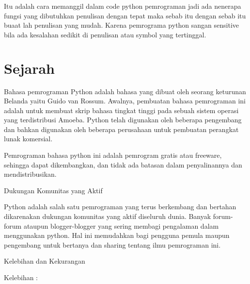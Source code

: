 {{{{{{{{\vspace{14pt}
\noindent 
{\fontsize{14pt}{14pt}\selectfont Itu adalah cara memanggil dalam code python pemrograman jadi ada nenerapa fungsi yang dibutuhkan penulisan dengan tepat maka sebab itu dengan sebab itu buaat lah penulisan yang mudah. Karena pemrograma python sangan sensitive bila ada kesalahan sedikit di penulisan atau symbol yang tertinggal. \\} \par
\vspace{14pt}
\vspace{14pt}
\noindent 
{\fontsize{14pt}{14pt}\section {Sejarah}
\noindent 
{\fontsize{14pt}{14pt}\selectfont Bahasa pemrograman Python adalah bahasa yang dibuat oleh seorang keturunan Belanda yaitu Guido van Rossum. Awalnya, pembuatan bahasa pemrograman ini adalah untuk membuat skrip bahasa tingkat tinggi pada sebuah sistem operasi yang terdistribusi Amoeba. Python telah digunakan oleh beberapa pengembang dan bahkan digunakan oleh beberapa perusahaan untuk pembuatan perangkat lunak komersial. \\} \par
\noindent 
{\fontsize{14pt}{14pt}\selectfont Pemrograman bahasa python ini adalah pemrogram gratis atau freeware, sehingga dapat dikembangkan, dan tidak ada batasan dalam penyalinannya dan mendistribusikan. \\} \par
\vspace{14pt}
\noindent 
{\fontsize{14pt}{14pt}\selectfont Dukungan Komunitas yang Aktif \\} \par
\noindent 
{\fontsize{14pt}{14pt}\selectfont Python adalah salah satu pemrograman yang terus berkembang dan bertahan dikarenakan dukungan komunitas yang aktif diseluruh dunia. Banyak forum-forum ataupun blogger-blogger yang sering membagi pengalaman dalam menggunakan python. Hal ini memudahkan bagi pengguna pemula maupun pengembang untuk bertanya dan sharing tentang ilmu pemrograman ini. \\} \par
\noindent 
{\fontsize{14pt}{14pt}\selectfont Kelebihan dan Kekurangan \\} \par
\vspace{14pt}
\noindent 
{\fontsize{14pt}{14pt}\selectfont Kelebihan : \\} \par
}}}}}}}}}
